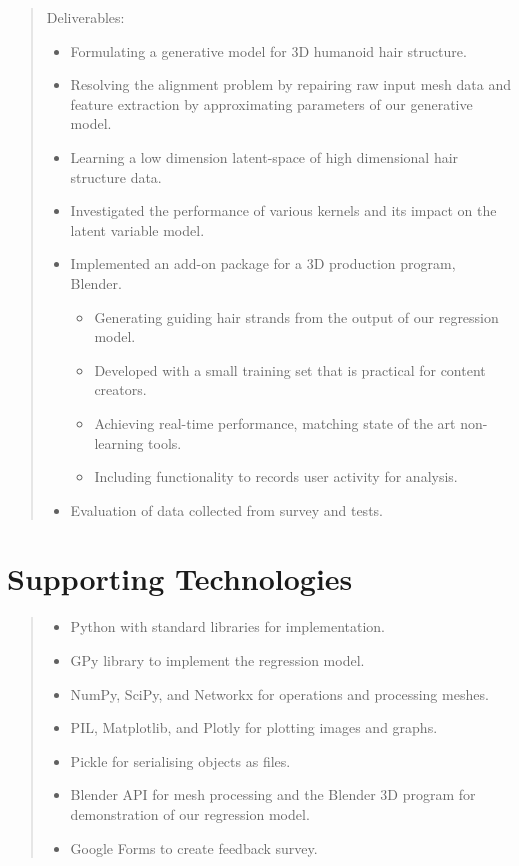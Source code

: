 \documentclass[ %
author={Dillon Keith Diep},
supervisor={Dr. Carl Henrik Ek},
degree={MEng},
title={ART-CG:},
subtitle={Assisted Real-time Content Generation of 3D Hair by Learning Manifolds},
type={Research},
year={2017} ]{dissertation}
\begin{document}
\begin{quote}
	Deliverables:
	\begin{itemize}
		\item Formulating a generative model for 3D humanoid hair structure.
		\item Resolving the alignment problem by repairing raw input mesh data and feature extraction by approximating parameters of our generative model.
		\item Learning a low dimension latent-space of high dimensional hair structure data.
		\item Investigated the performance of various kernels and its impact on the latent variable model.
		\item Implemented an add-on package for a 3D production program, Blender.
		\begin{itemize}
			\item Generating guiding hair strands from the output of our regression model.
			\item Developed with a small training set that is practical for content creators.
			\item Achieving real-time performance, matching state of the art non-learning tools.
			\item Including functionality to records user activity for analysis.
		\end{itemize}
		\item Evaluation of data collected from survey and tests.
	\end{itemize}
\end{quote}


\chapter*{Supporting Technologies}

\begin{quote}
	\noindent
	\begin{itemize}
		\item Python with standard libraries for implementation.
		\item GPy library to implement the regression model.
		\item NumPy, SciPy, and Networkx for operations and processing meshes.
		\item PIL, Matplotlib, and Plotly for plotting images and graphs.
		\item Pickle for serialising objects as files.
		\item Blender API for mesh processing and the Blender 3D program for demonstration of our regression model.
		\item Google Forms to create feedback survey.
	\end{itemize}
\end{quote}
\end{document}
